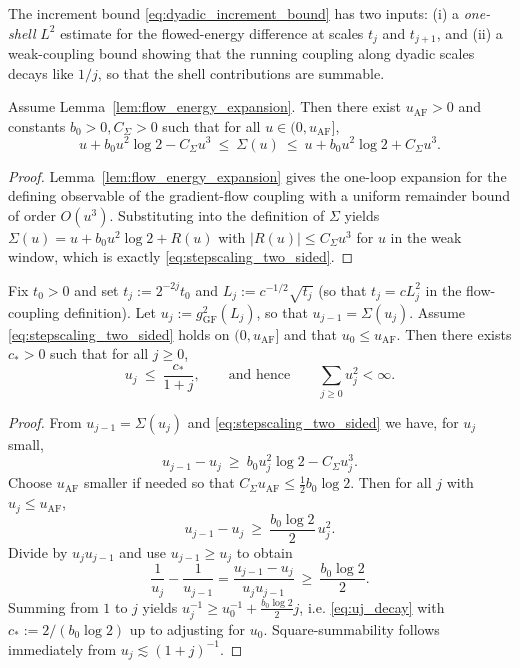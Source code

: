 The increment bound \eqref{eq:dyadic_increment_bound} has two inputs:
(i) a \emph{one-shell} $L^2$ estimate for the flowed-energy difference at scales $t_j$ and $t_{j+1}$,
and (ii) a weak-coupling bound showing that the running coupling along dyadic scales decays like $1/j$,
so that the shell contributions are summable.

\begin{lemma}\label{lem:stepscaling_two_sided}
Assume Lemma~\ref{lem:flow_energy_expansion}. Then there exist $u_{\mathrm{AF}}>0$ and constants $b_0>0,C_\Sigma>0$ such that for all
$u\in(0,u_{\mathrm{AF}}]$,
\begin{equation}\label{eq:stepscaling_two_sided}
 u + b_0 u^2 \log 2 - C_\Sigma u^3 \ \le\ \Sigma(u)\ \le\ u + b_0 u^2 \log 2 + C_\Sigma u^3 .
\end{equation}
\end{lemma}

\begin{proof}
Lemma~\ref{lem:flow_energy_expansion} gives the one-loop expansion for the defining observable of the gradient-flow coupling with a
uniform remainder bound of order $O(u^3)$.
Substituting into the definition of $\Sigma$ yields
$\Sigma(u)=u+b_0u^2\log 2+R(u)$ with $|R(u)|\le C_\Sigma u^3$ for $u$ in the weak window, which is exactly
\eqref{eq:stepscaling_two_sided}.
\end{proof}

\begin{lemma}\label{lem:dyadic_coupling_decay}
Fix $t_0>0$ and set $t_j:=2^{-2j}t_0$ and $L_j:=c^{-1/2}\sqrt{t_j}$ (so that $t_j=cL_j^2$ in the flow-coupling definition).
Let $u_j:=g_{\mathrm{GF}}^2(L_j)$, so that $u_{j-1}=\Sigma(u_j)$.
Assume \eqref{eq:stepscaling_two_sided} holds on $(0,u_{\mathrm{AF}}]$ and that $u_0\le u_{\mathrm{AF}}$.
Then there exists $c_*>0$ such that for all $j\ge 0$,
\begin{equation}\label{eq:uj_decay}
 u_j \ \le\ \frac{c_*}{1+j},
\qquad\text{and hence}\qquad
 \sum_{j\ge 0} u_j^2 < \infty .
\end{equation}
\end{lemma}

\begin{proof}
From $u_{j-1}=\Sigma(u_j)$ and \eqref{eq:stepscaling_two_sided} we have, for $u_j$ small,
\[
u_{j-1}-u_j \ \ge\ b_0 u_j^2\log 2 - C_\Sigma u_j^3.
\]
Choose $u_{\mathrm{AF}}$ smaller if needed so that $C_\Sigma u_{\mathrm{AF}}\le \tfrac12 b_0\log 2$.
Then for all $j$ with $u_j\le u_{\mathrm{AF}}$,
\[
u_{j-1}-u_j \ \ge\ \frac{b_0\log 2}{2}\,u_j^2.
\]
Divide by $u_j u_{j-1}$ and use $u_{j-1}\ge u_j$ to obtain
\[
\frac{1}{u_j}-\frac{1}{u_{j-1}}
=\frac{u_{j-1}-u_j}{u_j u_{j-1}}
\ \ge\ \frac{b_0\log 2}{2}.
\]
Summing from $1$ to $j$ yields $u_j^{-1}\ge u_0^{-1}+\tfrac{b_0\log 2}{2}j$, i.e. \eqref{eq:uj_decay} with
$c_*:=2/(b_0\log 2)$ up to adjusting for $u_0$.
Square-summability follows immediately from $u_j\lesssim (1+j)^{-1}$.
\end{proof}


